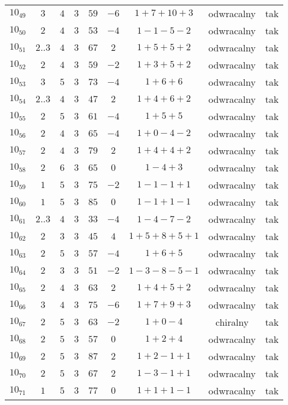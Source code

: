 \begin{longtable}{ccccccccc}
$10_{49}$ & $3$ & $4$ & $3$ & $59$ & $-6$ & $1+7+10+3$ & odwracalny & tak \\
$10_{50}$ & $2$ & $4$ & $3$ & $53$ & $-4$ & $1-1-5-2$ & odwracalny & tak \\
$10_{51}$ & $2..3$ & $4$ & $3$ & $67$ & $2$ & $1+5+5+2$ & odwracalny & tak \\
$10_{52}$ & $2$ & $4$ & $3$ & $59$ & $-2$ & $1+3+5+2$ & odwracalny & tak \\
$10_{53}$ & $3$ & $5$ & $3$ & $73$ & $-4$ & $1+6+6$ & odwracalny & tak \\
$10_{54}$ & $2..3$ & $4$ & $3$ & $47$ & $2$ & $1+4+6+2$ & odwracalny & tak \\
$10_{55}$ & $2$ & $5$ & $3$ & $61$ & $-4$ & $1+5+5$ & odwracalny & tak \\
$10_{56}$ & $2$ & $4$ & $3$ & $65$ & $-4$ & $1+0-4-2$ & odwracalny & tak \\
$10_{57}$ & $2$ & $4$ & $3$ & $79$ & $2$ & $1+4+4+2$ & odwracalny & tak \\
$10_{58}$ & $2$ & $6$ & $3$ & $65$ & $0$ & $1-4+3$ & odwracalny & tak \\
$10_{59}$ & $1$ & $5$ & $3$ & $75$ & $-2$ & $1-1-1+1$ & odwracalny & tak \\
$10_{60}$ & $1$ & $5$ & $3$ & $85$ & $0$ & $1-1+1-1$ & odwracalny & tak \\
$10_{61}$ & $2..3$ & $4$ & $3$ & $33$ & $-4$ & $1-4-7-2$ & odwracalny & tak \\
$10_{62}$ & $2$ & $3$ & $3$ & $45$ & $4$ & $1+5+8+5+1$ & odwracalny & tak \\
$10_{63}$ & $2$ & $5$ & $3$ & $57$ & $-4$ & $1+6+5$ & odwracalny & tak \\
$10_{64}$ & $2$ & $3$ & $3$ & $51$ & $-2$ & $1-3-8-5-1$ & odwracalny & tak \\
$10_{65}$ & $2$ & $4$ & $3$ & $63$ & $2$ & $1+4+5+2$ & odwracalny & tak \\
$10_{66}$ & $3$ & $4$ & $3$ & $75$ & $-6$ & $1+7+9+3$ & odwracalny & tak \\
$10_{67}$ & $2$ & $5$ & $3$ & $63$ & $-2$ & $1+0-4$ & chiralny & tak \\
$10_{68}$ & $2$ & $5$ & $3$ & $57$ & $0$ & $1+2+4$ & odwracalny & tak \\
$10_{69}$ & $2$ & $5$ & $3$ & $87$ & $2$ & $1+2-1+1$ & odwracalny & tak \\
$10_{70}$ & $2$ & $5$ & $3$ & $67$ & $2$ & $1-3-1+1$ & odwracalny & tak \\
$10_{71}$ & $1$ & $5$ & $3$ & $77$ & $0$ & $1+1+1-1$ & odwracalny & tak \\

\end{longtable}
